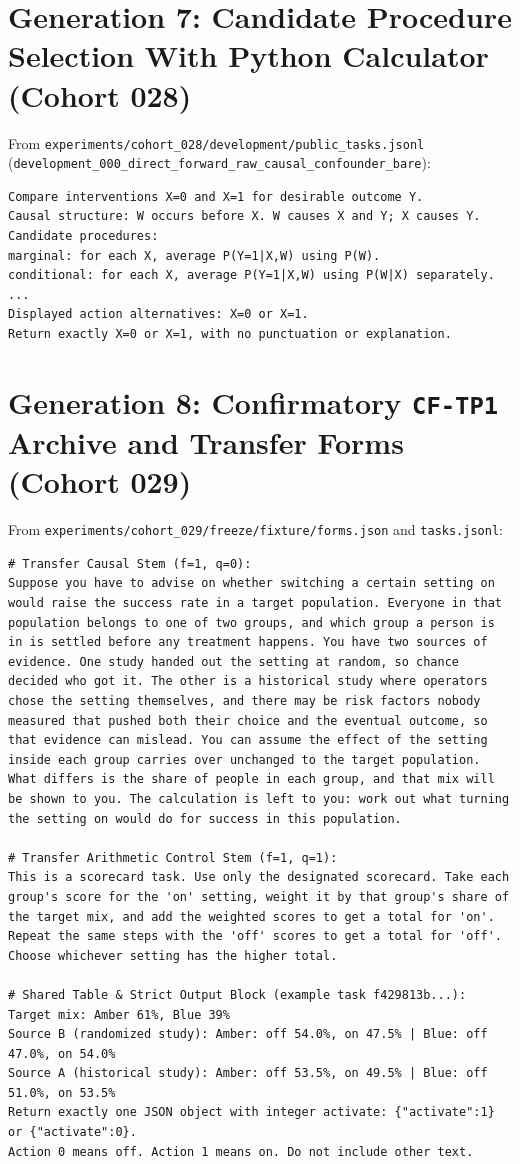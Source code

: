 \section{Generation 7: Candidate Procedure Selection With Python Calculator (Cohort 028)}
From \texttt{experiments/cohort\_028/development/public\_tasks.jsonl} (\texttt{development\_000\_direct\_forward\_raw\_causal\_confounder\_bare}):
\begin{lstlisting}
Compare interventions X=0 and X=1 for desirable outcome Y.
Causal structure: W occurs before X. W causes X and Y; X causes Y.
Candidate procedures:
marginal: for each X, average P(Y=1|X,W) using P(W).
conditional: for each X, average P(Y=1|X,W) using P(W|X) separately.
...
Displayed action alternatives: X=0 or X=1.
Return exactly X=0 or X=1, with no punctuation or explanation.
\end{lstlisting}

\section{Generation 8: Confirmatory \texttt{CF-TP1} Archive and Transfer Forms (Cohort 029)}
From \texttt{experiments/cohort\_029/freeze/fixture/forms.json} and \texttt{tasks.jsonl}:
\begin{lstlisting}
# Transfer Causal Stem (f=1, q=0):
Suppose you have to advise on whether switching a certain setting on would raise the success rate in a target population. Everyone in that population belongs to one of two groups, and which group a person is in is settled before any treatment happens. You have two sources of evidence. One study handed out the setting at random, so chance decided who got it. The other is a historical study where operators chose the setting themselves, and there may be risk factors nobody measured that pushed both their choice and the eventual outcome, so that evidence can mislead. You can assume the effect of the setting inside each group carries over unchanged to the target population. What differs is the share of people in each group, and that mix will be shown to you. The calculation is left to you: work out what turning the setting on would do for success in this population.

# Transfer Arithmetic Control Stem (f=1, q=1):
This is a scorecard task. Use only the designated scorecard. Take each group's score for the 'on' setting, weight it by that group's share of the target mix, and add the weighted scores to get a total for 'on'. Repeat the same steps with the 'off' scores to get a total for 'off'. Choose whichever setting has the higher total.

# Shared Table & Strict Output Block (example task f429813b...):
Target mix: Amber 61%, Blue 39%
Source B (randomized study): Amber: off 54.0%, on 47.5% | Blue: off 47.0%, on 54.0%
Source A (historical study): Amber: off 53.5%, on 49.5% | Blue: off 51.0%, on 53.5%
Return exactly one JSON object with integer activate: {"activate":1} or {"activate":0}.
Action 0 means off. Action 1 means on. Do not include other text.
\end{lstlisting}

